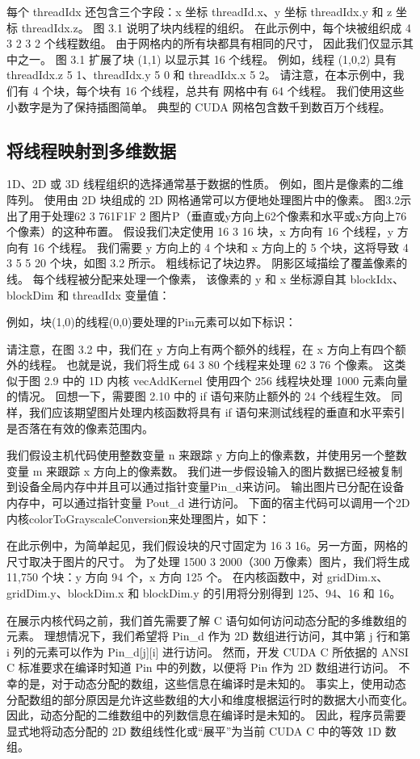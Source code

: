 每个 threadIdx 还包含三个字段：x 坐标 threadId.x、y 坐标 threadIdx.y 和 z 坐标 threadIdx.z。 
图 3.1 说明了块内线程的组织。 在此示例中，每个块被组织成 4 3 2 3 2 个线程数组。 由于网格内的所有块都具有相同的尺寸，
因此我们仅显示其中之一。 图 3.1 扩展了块 (1,1) 以显示其 16 个线程。 
例如，线程 (1,0,2) 具有 threadIdx.z 5 1、threadIdx.y 5 0 和 threadIdx.x 5 2。
请注意，在本示例中，我们有 4 个块，每个块有 16 个线程，总共有 网格中有 64 个线程。 
我们使用这些小数字是为了保持插图简单。 典型的 CUDA 网格包含数千到数百万个线程。

\subsection{将线程映射到多维数据}
1D、2D 或 3D 线程组织的选择通常基于数据的性质。 例如，图片是像素的二维阵列。 
使用由 2D 块组成的 2D 网格通常可以方便地处理图片中的像素。 
图3.2示出了用于处理62 3 761F1F 2 图片P（垂直或y方向上62个像素和水平或x方向上76个像素）的这种布置。 
假设我们决定使用 16 3 16 块，x 方向有 16 个线程，y 方向有 16 个线程。 
我们需要 y 方向上的 4 个块和 x 方向上的 5 个块，这将导致 4 3 5 5 20 个块，如图 3.2 所示。 
粗线标记了块边界。 阴影区域描绘了覆盖像素的线。 每个线程被分配来处理一个像素，
该像素的 y 和 x 坐标源自其 blockIdx、blockDim 和 threadIdx 变量值：

例如，块(1,0)的线程(0,0)要处理的Pin元素可以如下标识：

请注意，在图 3.2 中，我们在 y 方向上有两个额外的线程，在 x 方向上有四个额外的线程。 
也就是说，我们将生成 64 3 80 个线程来处理 62 3 76 个像素。 
这类似于图 2.9 中的 1D 内核 vecAddKernel 使用四个 256 线程块处理 1000 元素向量的情况。 
回想一下，需要图 2.10 中的 if 语句来防止额外的 24 个线程生效。 
同样，我们应该期望图片处理内核函数将具有 if 语句来测试线程的垂直和水平索引是否落在有效的像素范围内。

我们假设主机代码使用整数变量 n 来跟踪 y 方向上的像素数，并使用另一个整数变量 m 来跟踪 x 方向上的像素数。 
我们进一步假设输入的图片数据已经被复制到设备全局内存中并且可以通过指针变量Pin\_d来访问。 
输出图片已分配在设备内存中，可以通过指针变量 Pout\_d 进行访问。 
下面的宿主代码可以调用一个2D内核colorToGrayscaleConversion来处理图片，如下：

在此示例中，为简单起见，我们假设块的尺寸固定为 16 3 16。另一方面，网格的尺寸取决于图片的尺寸。 
为了处理 1500 3 2000（300 万像素）图片，我们将生成 11,750 个块：y 方向 94 个，x 方向 125 个。 
在内核函数中，对 gridDim.x、gridDim.y、blockDim.x 和 blockDim.y 的引用将分别得到 125、94、16 和 16。

在展示内核代码之前，我们首先需要了解 C 语句如何访问动态分配的多维数组的元素。 
理想情况下，我们希望将 Pin\_d 作为 2D 数组进行访问，其中第 j 行和第 i 列的元素可以作为 Pin\_d[j][i] 进行访问。 
然而，开发 CUDA C 所依据的 ANSI C 标准要求在编译时知道 Pin 中的列数，以便将 Pin 作为 2D 数组进行访问。 
不幸的是，对于动态分配的数组，这些信息在编译时是未知的。 
事实上，使用动态分配数组的部分原因是允许这些数组的大小和维度根据运行时的数据大小而变化。 
因此，动态分配的二维数组中的列数信息在编译时是未知的。 
因此，程序员需要显式地将动态分配的 2D 数组线性化或“展平”为当前 CUDA C 中的等效 1D 数组。

